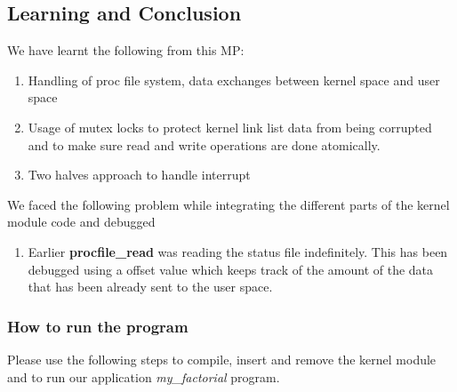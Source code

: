 \documentclass[11pt]{article}
\begin{document}
\subsection{Learning and Conclusion}\label{subsec:LC}
We have learnt the following from this MP:
\begin{enumerate}
    \item Handling of proc file system, data exchanges between kernel space and user space
    \item Usage of mutex locks to protect kernel link list data from being corrupted and to make sure read and write operations are done atomically.
    \item Two halves approach to handle interrupt
\end{enumerate}

\noindent We faced the following problem while integrating the different parts of the kernel module code and debugged
\begin{enumerate}
    \item Earlier {\bf procfile\_read} was reading the status file indefinitely. This has been debugged using a offset value which keeps track of the amount of the data that has been already sent to the user space.
\end{enumerate}

\subsubsection{How to run the program}

Please use the following steps to compile, insert and remove the kernel module and to run our application {\em my\_factorial } program.
\end{document}
